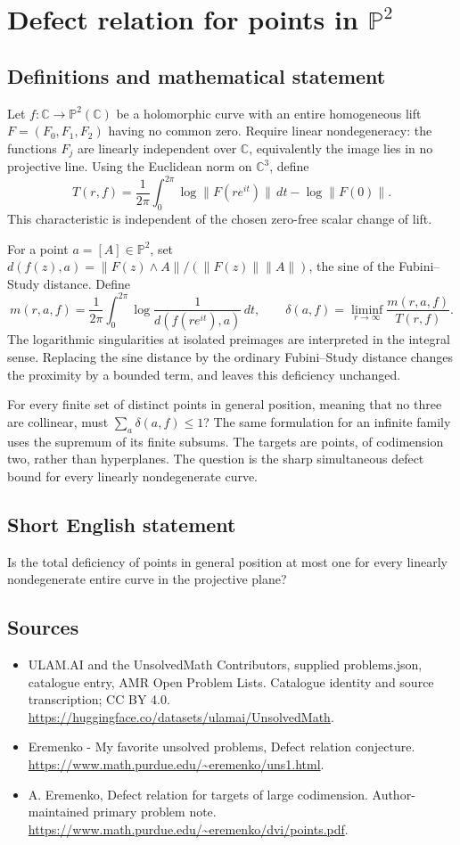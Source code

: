 \documentclass[11pt,a4paper]{article}
\begin{document}
\section*{Defect relation for points in $\mathbb P^2$}\label{statement}

\subsection{Definitions and mathematical statement}
Let $f:\mathbb C\to\mathbb P^2(\mathbb C)$ be
a holomorphic curve with an entire homogeneous lift
$F=(F_0,F_1,F_2)$ having no common zero.
Require linear nondegeneracy: the functions $F_j$
are linearly independent over $\mathbb C$, equivalently
the image lies in no projective line.
Using the Euclidean norm on $\mathbb C^3$, define
\[
 T(r,f)=\frac1{2\pi}\int_0^{2\pi}
               \log\|F(re^{it})\|\,dt-\log\|F(0)\|.
\]
This characteristic is independent of the chosen
zero-free scalar change of lift.

For a point $a=[A]\in\mathbb P^2$, set
$d(f(z),a)=\|F(z)\wedge A\|/(\|F(z)\|\|A\|)$,
the sine of the Fubini--Study distance. Define
\[
 m(r,a,f)=\frac1{2\pi}\int_0^{2\pi}
                    \log\frac1{d(f(re^{it}),a)}\,dt,
 \qquad
 \delta(a,f)=\liminf_{r\to\infty}\frac{m(r,a,f)}{T(r,f)}.
\]
The logarithmic singularities at isolated preimages
are interpreted in the integral sense. Replacing
the sine distance by the ordinary Fubini--Study
distance changes the proximity by a bounded term,
and leaves this deficiency unchanged.

For every finite set of distinct points in
general position, meaning that no three are
collinear, must
$\sum_a\delta(a,f)\leq1$?
The same formulation for an infinite family uses
the supremum of its finite subsums. The targets
are points, of codimension two, rather than
hyperplanes. The question is the sharp simultaneous
defect bound for every linearly nondegenerate curve.
\subsection{Short English statement}
Is the total deficiency of points in general position at most one for every linearly nondegenerate entire curve in the projective plane?
\subsection{Sources}
\begin{itemize}
\item[S1] ULAM.AI and the UnsolvedMath Contributors, supplied problems.json, catalogue entry, AMR Open Problem Lists. Catalogue identity and source transcription; CC BY 4.0.
\url{https://huggingface.co/datasets/ulamai/UnsolvedMath}.
\item[S2] Eremenko - My favorite unsolved problems, Defect relation conjecture. 
\url{https://www.math.purdue.edu/~eremenko/uns1.html}.
\item[S3] A. Eremenko, Defect relation for targets of large codimension. Author-maintained primary problem note.
\url{https://www.math.purdue.edu/~eremenko/dvi/points.pdf}.
\end{itemize}
\end{document}
